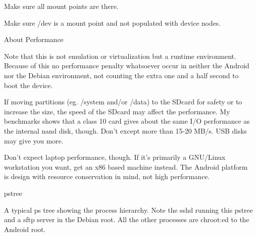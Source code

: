 Make sure all mount points are there.

Make sure /dev is a mount point and not populated with device nodes.

About Performance

Note that this is not emulation or virtualization but a runtime environment.
Because of this no performance penalty whatsoever occur in neither the Android
nor the Debian environment, not counting the extra one and a half second to boot
the device.

If moving partitions (eg. /system and/or /data) to the SDcard for safety or to
increase the size, the speed of the SDcard may affect the performance. My
benchmarks shows that a class 10 card gives about the same I/O performance as
the internal nand disk, though. Don't except more than 15-20 MB/s. USB disks may
give you more.

Don't expect laptop performance, though. If it's primarily a GNU/Linux
workstation you want, get an x86 based machine instead. The Android platform is
design with resource conservation in mind, not high performance.

pstree

A typical ps tree showing the process hierarchy. Note the sshd running this
pstree and a sftp server in the Debian root. All the other processes are
chroot:ed to the Android root.



